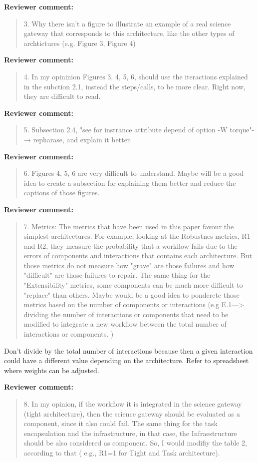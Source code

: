 \documentclass[a4]{article}
\newenvironment{review}%
{\textbf{Reviewer comment:}\begin{quote}}%
{\end{quote}}%
\newcommand{\todo}[1]{\color{red}#1\color{black}}
\begin{document}
  

\begin{review}
  3. Why there isn't a figure to illustrate an example of a real
  science gateway that corresponds to this architecture, like the
  other types of archtictures (e.g. Figure 3, Figure 4)
\end{review}

\begin{review}
  4. In my opininion Figures 3, 4, 5, 6, should use the iteractions
  explained in the subction 2.1, instead the steps/calls, to be more
  clear. Right now, they are difficult to read.
\end{review}

\begin{review}
  5.  Subsection 2.4, "see for instrance attribute depend of option -W
  torque"-→ repharase, and explain it better.
\end{review}

\begin{review}
6.  Figures 4, 5, 6 are very difficult to understand. Maybe will be a
good idea to create a subsection for explaining them better and reduce
the captions of those figures.
\end{review}

\begin{review}
  7.  Metrics: The metrics that have been used in this paper favour
  the simplest architectures. For example, looking at the Robustnes
  metrics, R1 and R2, they measure the probability that a workflow
  fails due to the errors of components and interactions that contains
  each architecture. But those metrics do not measure how "grave" are
  those failures and how "difficult" are those failures to repair. The
  same thing for the "Extensibility" metrics, some components can be
  much more difficult to "replace" than others.  Maybe would be a good
  idea to ponderete those metrics based on the number of components or
  interactions (e.g E.1---> dividing the number of interactions or
  components that need to be modified to integrate a new workflow
  between the total number of interactions or components. )
\end{review}

\todo{Don't divide by the total number of interactions because then a
  given interaction could have a different value depending on the
  architecture. Refer to spreadsheet where weights can be adjusted.}

\begin{review}
8. In my opinion, if the workflow it is integrated in the science
gateway (tight architecture), then the science gateway should be
evaluated as a component, since it also could fail. The same thing for
the task encapsulation and the infrastructure, in that case, the
Infraestructure should be also considered as component. So, I would
modifiy the table 2, according to that ( e.g., R1=1 for Tight and Task
architecture).
\end{review}
\end{document}
